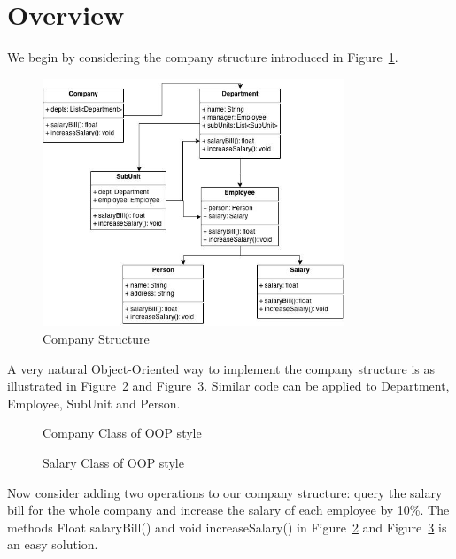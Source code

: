 \section{Overview}\label{subsec:overview}
We begin by considering the company structure introduced in Figure~\ref{company_structure}.

\begin{figure}[ht!]
\centering
\includegraphics[width=90mm]{Company.jpg}
\caption{Company Structure \label{company_structure}}
\end{figure}

A very natural Object-Oriented way to implement the company structure is as illustrated in Figure~\ref{oop_company} and Figure~\ref{oop_salary}. Similar code can be applied to Department, Employee, SubUnit and Person. 

\begin{figure}[tb]
\vspace{-.1in}
\caption{Company Class of OOP style}
\label{oop_company}
\end{figure}

\begin{figure}[tb]
\vspace{-.1in}
\caption{Salary Class of OOP style}
\label{oop_salary}
\end{figure}

Now consider adding two operations to our company structure: query the salary bill for the whole company and increase the salary of each employee by 10\%. The methods Float salaryBill() and void increaseSalary() in Figure~\ref{oop_company} and Figure~\ref{oop_salary} is an easy solution. 


